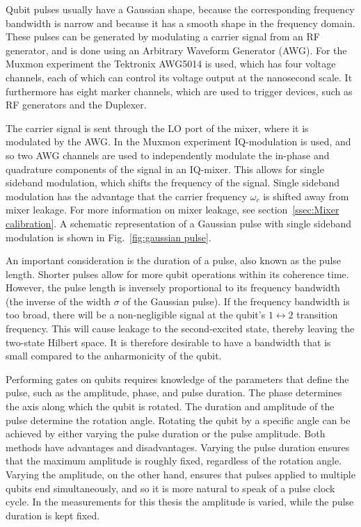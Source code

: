         Qubit pulses usually have a Gaussian shape, because the corresponding frequency bandwidth is narrow and because it has a smooth shape in the frequency domain. These pulses can be generated by modulating a carrier signal from an RF generator, and is done using an Arbitrary Waveform Generator (AWG). For the Muxmon experiment the Tektronix AWG5014 is used, which has four voltage channels, each of which can control its voltage output at the nanosecond scale. It furthermore has eight marker channels, which are used to trigger devices, such as RF generators and the Duplexer.

        The carrier signal is sent through the LO port of the mixer, where it is modulated by the AWG. In the Muxmon experiment IQ-modulation is used, and so two AWG channels are used to independently modulate the in-phase and quadrature components of the signal in an IQ-mixer. This allows for single sideband modulation, which shifts the frequency of the signal. Single sideband modulation has the advantage that the carrier frequency $\omega_c$ is shifted away from mixer leakage. For more information on mixer leakage, see section~\ref{ssec:Mixer calibration}. A schematic representation of a Gaussian pulse with single sideband modulation is shown in Fig.~\ref{fig:gaussian pulse}.

        An important consideration is the duration of a pulse, also known as the pulse length. Shorter pulses allow for more qubit operations within its coherence time. However, the pulse length is inversely proportional to its frequency bandwidth (the inverse of the width $\sigma$ of the Gaussian pulse). If the frequency bandwidth is too broad, there will be a non-negligible signal at the qubit's $1 \leftrightarrow 2$ transition frequency. This will cause leakage to the second-excited state, thereby leaving the two-state Hilbert space. It is therefore desirable to have a bandwidth that is small compared to the anharmonicity of the qubit.

        Performing gates on qubits requires knowledge of the parameters that define the pulse, such as the amplitude, phase, and pulse duration. The phase determines the axis along which the qubit is rotated. The duration and amplitude of the pulse determine the rotation angle. Rotating the qubit by a specific angle can be achieved by either varying the pulse duration or the pulse amplitude. Both methods have advantages and disadvantages. Varying the pulse duration ensures that the maximum amplitude is roughly fixed, regardless of the rotation angle. Varying the amplitude, on the other hand, ensures that pulses applied to multiple qubits end simultaneously, and so it is more natural to speak of a pulse clock cycle. In the measurements for this thesis the amplitude is varied, while the pulse duration is kept fixed.


